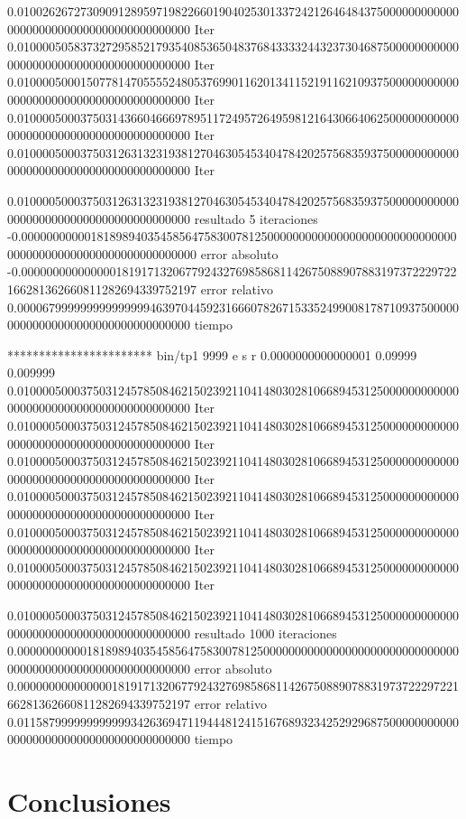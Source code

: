 \documentclass[10pt,a4paper]{article}
\begin{document}
0.010026267273090912895971982266019040253013372421264648437500000000000000000000000000000000000000000 Iter
0.010000505837327295852179354085365048376843333244323730468750000000000000000000000000000000000000000 Iter
0.010000500015077814705555248053769901162013411521911621093750000000000000000000000000000000000000000 Iter
0.010000500037503143660466697895117249572649598121643066406250000000000000000000000000000000000000000 Iter
0.010000500037503126313231938127046305453404784202575683593750000000000000000000000000000000000000000 Iter

0.010000500037503126313231938127046305453404784202575683593750000000000000000000000000000000000000000 resultado
5 iteraciones
-0.000000000001818989403545856475830078125000000000000000000000000000000000000000000000000000000000000 error absoluto
-0.000000000000000181917132067792432769858681142675088907883197372229722166281362660811282694339752197 error relativo
0.000067999999999999999463970445923166607826715335249900817871093750000000000000000000000000000000000 tiempo

*********************** bin/tp1 9999 e s r 0.0000000000000001 0.09999 0.009999
0.010000500037503124578508462150239211041480302810668945312500000000000000000000000000000000000000000 Iter
0.010000500037503124578508462150239211041480302810668945312500000000000000000000000000000000000000000 Iter
0.010000500037503124578508462150239211041480302810668945312500000000000000000000000000000000000000000 Iter
0.010000500037503124578508462150239211041480302810668945312500000000000000000000000000000000000000000 Iter
0.010000500037503124578508462150239211041480302810668945312500000000000000000000000000000000000000000 Iter
0.010000500037503124578508462150239211041480302810668945312500000000000000000000000000000000000000000 Iter

0.010000500037503124578508462150239211041480302810668945312500000000000000000000000000000000000000000 resultado
1000 iteraciones
0.000000000001818989403545856475830078125000000000000000000000000000000000000000000000000000000000000 error absoluto
0.000000000000000181917132067792432769858681142675088907883197372229722166281362660811282694339752197 error relativo
0.011587999999999999342636947119444812415167689323425292968750000000000000000000000000000000000000000 tiempo


\section{Conclusiones}
\end{document}
